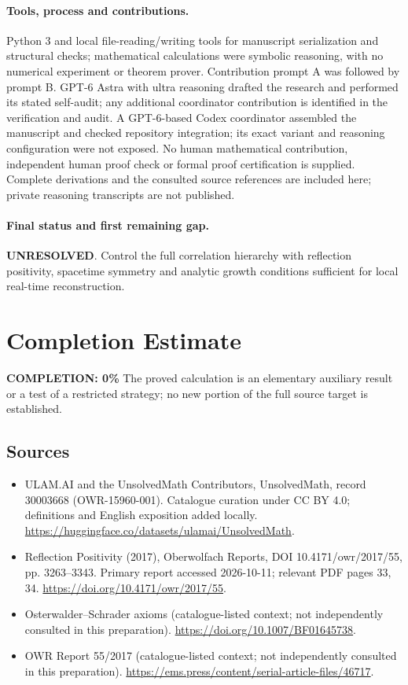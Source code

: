 \documentclass[11pt]{article}
\begin{document}
\paragraph{Tools, process and contributions.}
Python 3 and local file-reading/writing tools for manuscript serialization and structural checks; mathematical calculations were symbolic reasoning, with no numerical experiment or theorem prover. Contribution prompt A was followed by prompt B. GPT-6 Astra with ultra reasoning drafted the research and performed its stated self-audit; any additional coordinator contribution is identified in the verification and audit. A GPT-6-based Codex coordinator assembled the manuscript and checked repository integration; its exact variant and reasoning configuration were not exposed. No human mathematical contribution, independent human proof check or formal proof certification is supplied. Complete derivations and the consulted source references are included here; private reasoning transcripts are not published.

\paragraph{Final status and first remaining gap.}
\textbf{UNRESOLVED}. Control the full correlation hierarchy with reflection positivity, spacetime symmetry and analytic growth conditions sufficient for local real-time reconstruction.

\section{Completion Estimate}
\noindent\textbf{COMPLETION: 0\%}
The proved calculation is an elementary auxiliary result or a test of a restricted strategy; no new portion of the full source target is established.

\subsection{Sources}
\begin{itemize}
\item[\hypertarget{source:30003668:1}{S1}] ULAM.AI and the UnsolvedMath Contributors, UnsolvedMath, record 30003668 (OWR-15960-001). Catalogue curation under CC BY 4.0; definitions and English exposition added locally.
\url{https://huggingface.co/datasets/ulamai/UnsolvedMath}.
\item[\hypertarget{source:30003668:2}{S2}] Reflection Positivity (2017), Oberwolfach Reports, DOI 10.4171/owr/2017/55, pp. 3263--3343. Primary report accessed 2026-10-11; relevant PDF pages 33, 34.
\url{https://doi.org/10.4171/owr/2017/55}.
\item[\hypertarget{source:30003668:3}{S3}] Osterwalder--Schrader axioms (catalogue-listed context; not independently consulted in this preparation).
\url{https://doi.org/10.1007/BF01645738}.
\item[\hypertarget{source:30003668:4}{S4}] OWR Report 55/2017 (catalogue-listed context; not independently consulted in this preparation).
\url{https://ems.press/content/serial-article-files/46717}.
\end{itemize}
\label{end:30003668}
\end{document}
